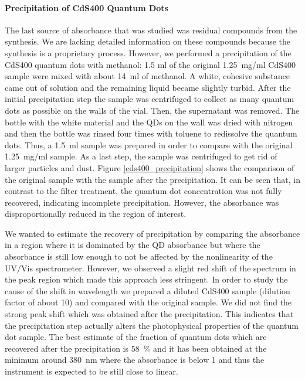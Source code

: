 \documentclass[cits]{JINST}
\begin{document}
\paragraph{Precipitation of CdS400 Quantum Dots}
\label{precipitation_subsection} 
The last source of absorbance that was studied was residual compounds from the synthesis. We are lacking detailed information on these compounds because the synthesis is a proprietary process. However, we performed a precipitation of the CdS400 quantum dots with methanol: 1.5 ml of the original 1.25~mg/ml CdS400 sample were mixed with about 14~ml of methanol. A white, cohesive substance came out of solution and the remaining liquid became slightly turbid. After the initial precipitation step the sample was centrifuged to collect as many quantum dots as possible on the walls of the vial. Then, the supernatant was removed. The bottle with the white material and the QDs on the wall was dried with nitrogen and then the bottle was rinsed four times with toluene to redissolve the quantum dots. Thus, a 1.5~ml sample was prepared in order to compare with the original 1.25~mg/ml sample. As a last step, the sample was centrifuged to get rid of larger particles and dust. Figure \ref{cds400_precipitation} shows the comparison of the original sample with the sample after the precipitation. It can be seen that, in contrast to the filter treatment, the quantum dot concentration was not fully recovered, indicating incomplete precipitation. However, the absorbance was disproportionally reduced in the region of interest. 

We wanted to estimate the recovery of precipitation by comparing the absorbance in a region where it is dominated by the QD absorbance but where the absorbance is still low enough to not be affected by the nonlinearity of the UV/Vis spectrometer. However, we observed a slight red shift of the spectrum in the peak region which made this approach less stringent. In order to study the cause of the shift in wavelength we prepared a diluted CdS400 sample (dilution factor of about 10) and compared with the original sample. We did not find the strong peak shift which was obtained after the precipitation. This indicates that the precipitation step actually alters the photophysical properties of the quantum dot sample. The best estimate of the fraction of quantum dots which are recovered after the precipitation is 58~\% and it has been obtained at the minimum around 380~nm where the absorbance is below 1 and thus the instrument is expected to be still close to linear. 
\end{document}
